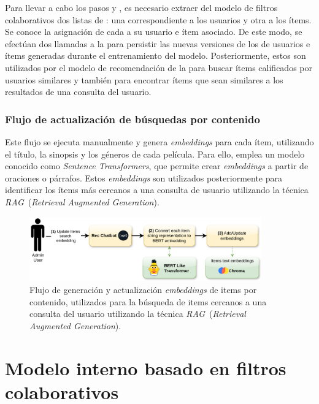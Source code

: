 \documentclass[11pt,a4paper,twoside]{thesis}
\begin{document}
Para llevar a cabo los pasos  y , es necesario extraer del modelo de filtros colaborativos dos listas de : una correspondiente a los usuarios y otra a los ítems. Se conoce la asignación de cada  a su usuario e ítem asociado. De este modo, se efectúan dos llamadas  a la  para persistir las nuevas versiones de los  de usuarios e ítems generadas durante el entrenamiento del modelo. Posteriormente, estos  son utilizados por el modelo de recomendación de la  para buscar ítems calificados por usuarios similares y también para encontrar ítems que sean similares a los resultados de una consulta del usuario.

\clearpage

\subsection{Flujo de actualización de búsquedas por contenido}

Este flujo se ejecuta manualmente y genera \textit{embeddings} para cada ítem, utilizando el título, la sinopsis y los géneros de cada película. Para ello, emplea un modelo conocido como \textit{Sentence Transformers}, que permite crear \textit{embeddings} a partir de oraciones o párrafos. Estos \textit{embeddings} son utilizados posteriormente para identificar los ítems más cercanos a una consulta de usuario utilizando la técnica \textit{RAG}~\cite{rag}(\textit{Retrieval Augmented Generation}).

\begin{figure}[H]
	\centering
	\label{fig:rag-update-flow}
	\includegraphics[width=10cm]{./images/rag-embedding-update.png}
	\caption{Flujo de generación y actualización \textit{embeddings} de items por contenido, utilizados para la búsqueda de items cercanos a una consulta del usuario utilizando la técnica \textit{RAG}~\cite{rag}(\textit{Retrieval Augmented Generation}).}
\end{figure}

\chapter{Modelo interno basado en filtros colaborativos}
\end{document}
